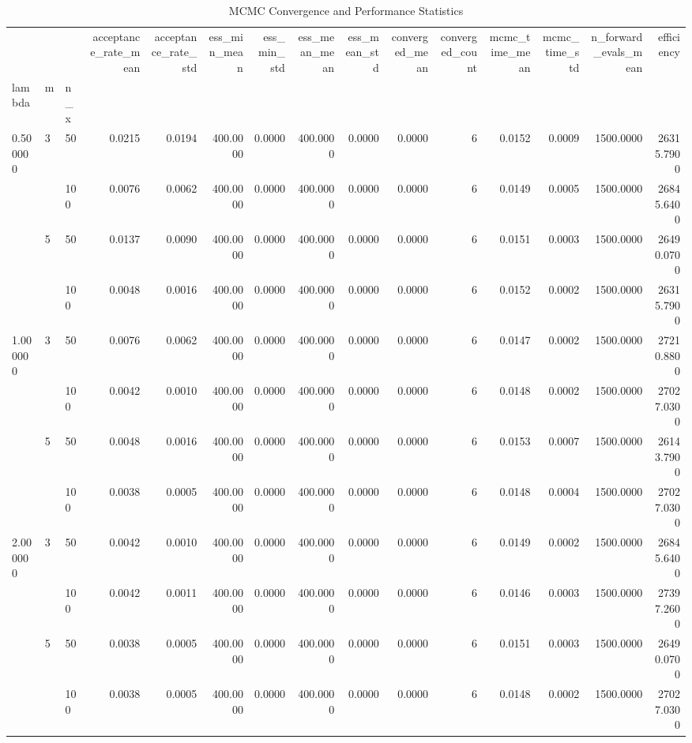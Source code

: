 \begin{table}
\caption{MCMC Convergence and Performance Statistics}
\label{tab:convergence}
\begin{tabular}{lllrrrrrrrrrrrr}
\toprule
 &  &  & acceptance_rate_mean & acceptance_rate_std & ess_min_mean & ess_min_std & ess_mean_mean & ess_mean_std & converged_mean & converged_count & mcmc_time_mean & mcmc_time_std & n_forward_evals_mean & efficiency \\
lambda & m & n_x &  &  &  &  &  &  &  &  &  &  &  &  \\
\midrule
\multirow[t]{4}{*}{0.500000} & \multirow[t]{2}{*}{3} & 50 & 0.0215 & 0.0194 & 400.0000 & 0.0000 & 400.0000 & 0.0000 & 0.0000 & 6 & 0.0152 & 0.0009 & 1500.0000 & 26315.7900 \\
 &  & 100 & 0.0076 & 0.0062 & 400.0000 & 0.0000 & 400.0000 & 0.0000 & 0.0000 & 6 & 0.0149 & 0.0005 & 1500.0000 & 26845.6400 \\
\cline{2-15}
 & \multirow[t]{2}{*}{5} & 50 & 0.0137 & 0.0090 & 400.0000 & 0.0000 & 400.0000 & 0.0000 & 0.0000 & 6 & 0.0151 & 0.0003 & 1500.0000 & 26490.0700 \\
 &  & 100 & 0.0048 & 0.0016 & 400.0000 & 0.0000 & 400.0000 & 0.0000 & 0.0000 & 6 & 0.0152 & 0.0002 & 1500.0000 & 26315.7900 \\
\cline{1-15} \cline{2-15}
\multirow[t]{4}{*}{1.000000} & \multirow[t]{2}{*}{3} & 50 & 0.0076 & 0.0062 & 400.0000 & 0.0000 & 400.0000 & 0.0000 & 0.0000 & 6 & 0.0147 & 0.0002 & 1500.0000 & 27210.8800 \\
 &  & 100 & 0.0042 & 0.0010 & 400.0000 & 0.0000 & 400.0000 & 0.0000 & 0.0000 & 6 & 0.0148 & 0.0002 & 1500.0000 & 27027.0300 \\
\cline{2-15}
 & \multirow[t]{2}{*}{5} & 50 & 0.0048 & 0.0016 & 400.0000 & 0.0000 & 400.0000 & 0.0000 & 0.0000 & 6 & 0.0153 & 0.0007 & 1500.0000 & 26143.7900 \\
 &  & 100 & 0.0038 & 0.0005 & 400.0000 & 0.0000 & 400.0000 & 0.0000 & 0.0000 & 6 & 0.0148 & 0.0004 & 1500.0000 & 27027.0300 \\
\cline{1-15} \cline{2-15}
\multirow[t]{4}{*}{2.000000} & \multirow[t]{2}{*}{3} & 50 & 0.0042 & 0.0010 & 400.0000 & 0.0000 & 400.0000 & 0.0000 & 0.0000 & 6 & 0.0149 & 0.0002 & 1500.0000 & 26845.6400 \\
 &  & 100 & 0.0042 & 0.0011 & 400.0000 & 0.0000 & 400.0000 & 0.0000 & 0.0000 & 6 & 0.0146 & 0.0003 & 1500.0000 & 27397.2600 \\
\cline{2-15}
 & \multirow[t]{2}{*}{5} & 50 & 0.0038 & 0.0005 & 400.0000 & 0.0000 & 400.0000 & 0.0000 & 0.0000 & 6 & 0.0151 & 0.0003 & 1500.0000 & 26490.0700 \\
 &  & 100 & 0.0038 & 0.0005 & 400.0000 & 0.0000 & 400.0000 & 0.0000 & 0.0000 & 6 & 0.0148 & 0.0002 & 1500.0000 & 27027.0300 \\
\cline{1-15} \cline{2-15}
\bottomrule
\end{tabular}
\end{table}
